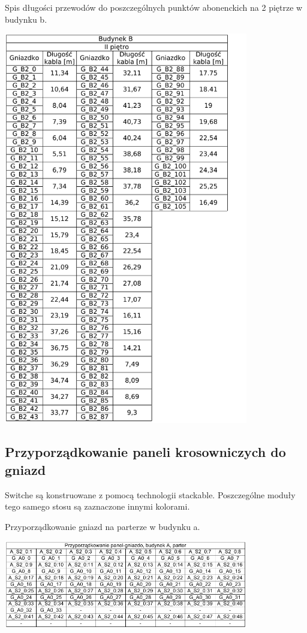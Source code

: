 \documentclass{report}
\begin{document}
\begin{table}[H]
\caption{Spis długości przewodów do poszczególnych punktów abonenckich na 2 piętrze w budynku b.}
 \centering
      \includegraphics[width=0.8\textwidth]{./obrazki/dl_kable/b2.png}
\end{table}

\subsection{Przyporządkowanie paneli krosowniczych do gniazd}

Switche są konstruowane z pomocą technologii stackable. Poszczególne moduły tego samego stosu są zaznaczone innymi kolorami.

\begin{table}[H]
\caption{Przyporządkowanie gniazd na parterze w budynku a.}
 \centering
      \includegraphics[width=0.8\textwidth]{./obrazki/tab_kros/a0.png}
\end{table}
\end{document}
